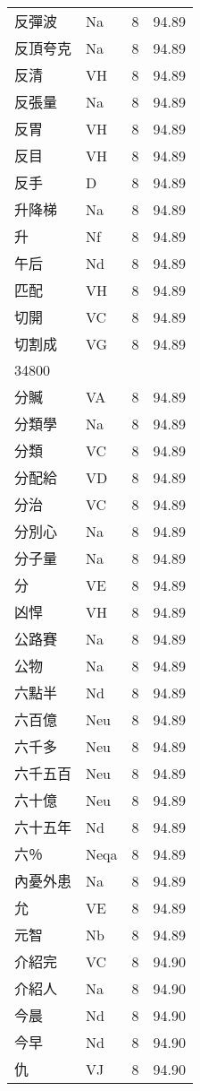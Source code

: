 \documentclass[twocolumn]{book}
\begin{document}
\begin{supertabular}{llrr}
反彈波 & Na & 8 &  94.89\\
反頂夸克 & Na & 8 &  94.89\\
反清 & VH & 8 &  94.89\\
反張量 & Na & 8 &  94.89\\
反胃 & VH & 8 &  94.89\\
反目 & VH & 8 &  94.89\\
反手 & D & 8 &  94.89\\
升降梯 & Na & 8 &  94.89\\
升 & Nf & 8 &  94.89\\
午后 & Nd & 8 &  94.89\\
匹配 & VH & 8 &  94.89\\
切開 & VC & 8 &  94.89\\
切割成 & VG & 8 &  94.89\\
34800\\
分贓 & VA & 8 &  94.89\\
分類學 & Na & 8 &  94.89\\
分類 & VC & 8 &  94.89\\
分配給 & VD & 8 &  94.89\\
分治 & VC & 8 &  94.89\\
分別心 & Na & 8 &  94.89\\
分子量 & Na & 8 &  94.89\\
分 & VE & 8 &  94.89\\
凶悍 & VH & 8 &  94.89\\
公路賽 & Na & 8 &  94.89\\
公物 & Na & 8 &  94.89\\
六點半 & Nd & 8 &  94.89\\
六百億 & Neu & 8 &  94.89\\
六千多 & Neu & 8 &  94.89\\
六千五百 & Neu & 8 &  94.89\\
六十億 & Neu & 8 &  94.89\\
六十五年 & Nd & 8 &  94.89\\
六％ & Neqa & 8 &  94.89\\
內憂外患 & Na & 8 &  94.89\\
允 & VE & 8 &  94.89\\
元智 & Nb & 8 &  94.89\\
介紹完 & VC & 8 &  94.90\\
介紹人 & Na & 8 &  94.90\\
今晨 & Nd & 8 &  94.90\\
今早 & Nd & 8 &  94.90\\
仇 & VJ & 8 &  94.90\\

\end{supertabular}
\end{document}
